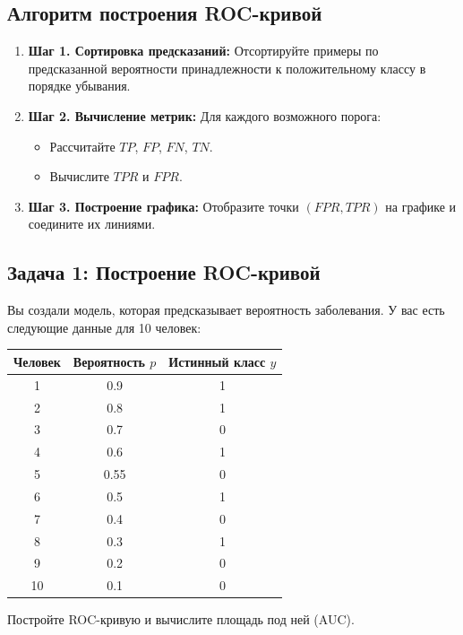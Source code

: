 \subsection*{Алгоритм построения ROC-кривой}

\begin{enumerate}
    \item \textbf{Шаг 1. Сортировка предсказаний:} Отсортируйте примеры по предсказанной вероятности принадлежности к положительному классу в порядке убывания.
    \item \textbf{Шаг 2. Вычисление метрик:} Для каждого возможного порога:
    \begin{itemize}
        \item Рассчитайте $TP$, $FP$, $FN$, $TN$.
        \item Вычислите $TPR$ и $FPR$.
    \end{itemize}
    \item \textbf{Шаг 3. Построение графика:} Отобразите точки $(FPR, TPR)$ на графике и соедините их линиями.
\end{enumerate}


\subsection*{Задача 1: Построение ROC-кривой}

Вы создали модель, которая предсказывает вероятность заболевания. У вас есть следующие данные для 10 человек:

\begin{table}[h!]
\centering
\begin{tabular}{|c|c|c|}
\hline
\textbf{Человек} & \textbf{Вероятность $p$} & \textbf{Истинный класс $y$} \\
\hline
1 & 0.9 & 1 \\
2 & 0.8 & 1 \\
3 & 0.7 & 0 \\
4 & 0.6 & 1 \\
5 & 0.55 & 0 \\
6 & 0.5 & 1 \\
7 & 0.4 & 0 \\
8 & 0.3 & 1 \\
9 & 0.2 & 0 \\
10 & 0.1 & 0 \\
\hline
\end{tabular}
\end{table}

Постройте ROC-кривую и вычислите площадь под ней (AUC).

